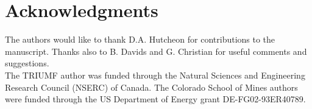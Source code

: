 \section{Acknowledgments}
The authors would like to thank D.A. Hutcheon for contributions to the manuscript. Thanks also to B. Davids and G. Christian for useful comments and suggestions. \\
The TRIUMF author was funded through the Natural Sciences and Engineering Research Council (NSERC) of Canada. The Colorado School of Mines authors were funded through the US Department of Energy grant DE-FG02-93ER40789. 


